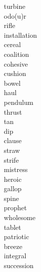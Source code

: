 \documentclass[a4paper, 11pt]{ctexart}
\begin{document}
\begin{multicols*}{3}
\begin{description}
\item[turbine]

\item[odo(u)r]

\item[rifle]

\item[installation]

\item[cereal]

\item[coalition]

\item[cohesive]

\item[cushion]

\item[bowel]

\item[haul]

\item[pendulum]

\item[thrust]

\item[tan]

\item[dip]

\item[clause]

\item[straw]

\item[strife]

\item[mistress]

\item[heroic]

\item[gallop]

\item[spine]

\item[prophet]

\item[wholesome]

\item[tablet]

\item[patriotic]

\item[breeze]

\item[integral]

\item[succession]


\end{description}
\end{multicols*}
\end{document}
